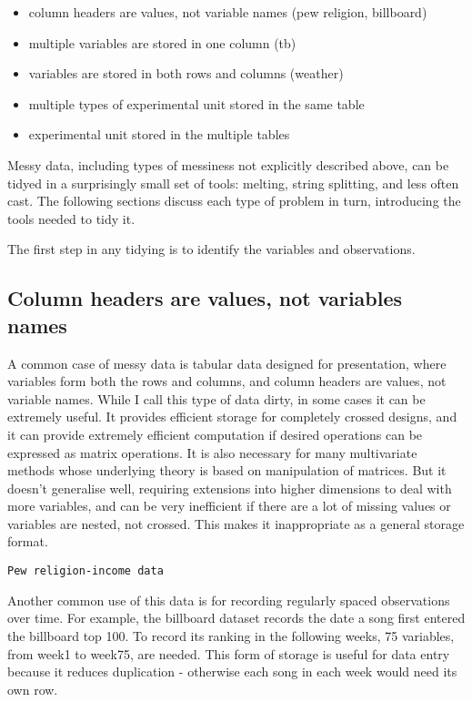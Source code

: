 \documentclass[oneside]{article}
\begin{document}
\begin{itemize}

\item column headers are values, not variable names (pew religion, billboard)
\item multiple variables are stored in one column (tb)
\item variables are stored in both rows and columns (weather)
\item multiple types of experimental unit stored in the same table
\item experimental unit stored in the multiple tables
\end{itemize}

Messy data, including types of messiness not explicitly described above, can be tidyed in a surprisingly small set of tools: melting, string splitting, and less often cast. The following sections discuss each type of problem in turn, introducing the tools needed to tidy it.

The first step in any tidying is to identify the variables and observations.

\subsection{Column headers are values, not variables names}

A common case of messy data is tabular data designed for presentation, where variables form both the rows and columns, and column headers are values, not variable names. While I call this type of data dirty, in some cases it can be extremely useful. It provides efficient storage for completely crossed designs, and it can provide extremely efficient computation if desired operations can be expressed as matrix operations. It is also necessary for many multivariate methods whose underlying theory is based on manipulation of matrices. But it doesn't generalise well, requiring extensions into higher dimensions to deal with more variables, and can be very inefficient if there are a lot of missing values or variables are nested, not crossed. This makes it inappropriate as a general storage format.

\begin{verbatim}
Pew religion-income data
\end{verbatim}

Another common use of this data is for recording regularly spaced observations over time. For example, the billboard dataset records the date a song first entered the billboard top 100. To record its ranking in the following weeks, 75 variables, from week1 to week75, are needed.  This form of storage is useful for data entry because it reduces duplication - otherwise each song in each week would need its own row.
\end{document}
